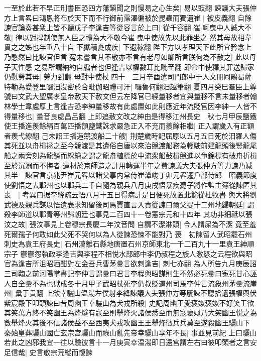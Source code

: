 一至於此若不早正刑書臣恐四方藩鎭聞之則慢易之心生矣|{
	易以豉翻}
諫議大夫張仲方上言畧曰鴻恩將布於天下而不行御前霈澤徧被於昆蟲而獨遺崔|{
	被皮義翻}
自餘諫官論奏甚衆上皆不聽戊子李逢吉等從容言於上曰|{
	從千容翻}
崔輒曳中人誠大不敬|{
	律以對捍制使無人臣之禮為大不敬今崔曳中使故先以此罪坐之}
然其母故相韋貫之之姊也年垂八十自下獄積憂成疾|{
	下遐稼翻}
陛下方以孝理天下此所宜矜念上乃愍然曰比諫官但言寃未嘗言其不敬亦不言有老母如卿所言朕何為不赦之|{
	此以母子天性感之易所謂納約自牖者也但逢吉以權數耳比毗至翻}
即命中使釋其罪送歸家仍慰勞其母|{
	勞力到翻}
母對中使杖四十　三月辛酉遣司門郎中于人文冊囘鶻曷薩特勒為愛登里囉汨沒密於合毗伽昭禮可汗|{
	囉魯何翻汨越筆翻}
夏四月癸巳羣臣上尊號曰文武大聖廣孝皇帝赦天下赦文但云左降官已經量移者宜與量移不言未量移者翰林學士韋處厚上言逢吉恐李紳量移故有此處置如此則應近年流貶官因李紳一人皆不得量移也|{
	量音良處昌呂翻}
上即追赦文改之紳由是得移江州長史　秋七月甲辰鹽鐵使王播進羨餘絹百萬匹播領鹽鐵誅求嚴急正入不充而羨餘相繼|{
	正入謂歲入有正額者羨弋線翻}
己未詔王播造競渡船二十艘|{
	荆楚歲時記屈原以五月五日死於汨羅人傷其死並以舟楫拯之至今競渡是其遺俗自唐以來治競渡船務為輕駛前建龍頭後豎龍尾船之兩旁刻為龍鱗而綵繪之謂之龍舟植標於中流衆船鼔楫競進以争錦標有破舟折楫至於沉溺而不悔者}
運材於京師造之計用轉運半年之費諫議大夫張仲方等力諫乃減其半　諫官言京兆尹崔元畧以諸父事内常侍崔潭峻丁卯元畧遷戶部侍郎　昭義節度使劉悟之去鄆州也以鄆兵二千自隨為親兵八月庚戌悟暴疾薨子將作監主簿從諫匿其喪　|{
	考異曰据李絳疏云悟八月十五日得病計是日便死故置此餘從杜牧書}
與大將劉武德及親兵謀以悟遺表求知留後司馬賈直言入責從諫曰爾父提十二州地歸朝廷|{
	謂殺李師道以鄆青等州歸朝廷也事見二百四十一卷憲宗元和十四年}
其功非細祗以張汶之故|{
	張汶事見上卷穆宗長慶二年汶音問}
自謂不潔淋頭|{
	今人謂屎為不潔}
竟至羞死爾孺子何敢如此父死不哭何以為人從諫恐悚不能對乃喪　初陳留人武昭罷石州刺史為袁王府長史|{
	石州漢離石縣地唐置石州京師東北一千二百九十一里袁王紳順宗子}
鬱鬱怨執政李逢吉與李程不相悦水部郎中李仍叔程之族人激怒之云程欲與昭官為逢吉所沮昭酒酣對左金吾兵曹茅彚言欲刺逢吉|{
	刺七亦翻}
為人所告九月庚辰詔三司鞫之前河陽掌書記李仲言謂彚曰君言李程與昭謀則生不然必死彚曰寃死甘心誣人自全彚不為也獄成冬十月甲子武昭杖死李仍叔貶道州司馬李仲言流象州茅彚流崖州|{
	彚于貴翻}
上欲幸驪山温湯左僕射李絳諫議大夫張仲方等屢諫不聽拾遺張權輿伏紫宸殿下叩頭諫曰昔周幽王幸驪山為犬戎所殺|{
	史記周幽王愛褒姒褒姒不好笑王欲其笑萬方終不笑幽王為烽燧有寇至則舉烽火諸侯悉至而無寇褒姒乃大笑幽王悦之為數舉烽火其後不信諸侯益不至西夷犬戎攻幽王王舉烽徵兵兵莫至遂殺幽王驪山下}
秦始皇葬驪山國亡玄宗宫驪山而祿山亂先帝幸驪山享年不長|{
	事並見前紀}
上曰驪山若此之凶邪我宜一往以驗彼言十一月庚寅幸温湯即日還宫謂左右曰彼叩頭者之言安足信哉|{
	史言敬宗荒縱而愎諫}
